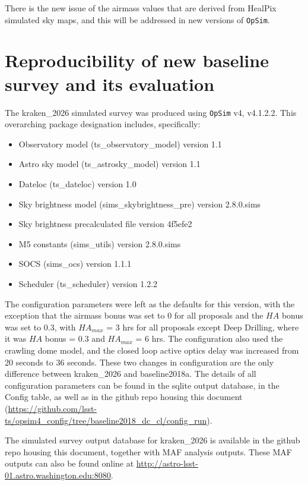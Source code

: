 \documentclass[DM,lsstdraft,authoryear,toc]{lsstdoc}
\newcommand{\opsim}{\texttt{OpSim}\xspace}
\begin{document}
There is the new issue of the airmass values that are derived from HealPix simulated sky maps, and this will be addressed
in new versions of \opsim.

\section{Reproducibility of new baseline survey and its evaluation}

The kraken\_2026  simulated survey was produced using \opsim v4, v4.1.2.2.  This overarching package designation includes, specifically:
\begin{itemize}
\item Observatory model (ts\_observatory\_model) version 1.1
\item Astro sky model (ts\_astrosky\_model) version 1.1
\item Dateloc (ts\_dateloc) version 1.0
\item Sky brightness model (sims\_skybrightness\_pre) version 2.8.0.sims
\item Sky brightness precalculated file version 4f5efe2
\item M5 constants (sims\_utils) version 2.8.0.sims
\item SOCS (sims\_ocs) version 1.1.1
\item Scheduler (ts\_scheduler) version 1.2.2
\end{itemize}

The configuration parameters were left as the defaults for this version, with the exception that the airmass bonus was set to 0 for all proposals and the $HA$ bonus was set to 0.3, with $HA_{max}$ = 3 hrs
for all proposals except Deep Drilling, where it was $HA$ bonus = 0.3 and $HA_{max}$ = 6 hrs. The configuration also used the
crawling dome model, and the closed loop active optics delay was increased from 20 seconds to 36 seconds.
These two changes in configuration are the only difference between kraken\_2026 and baseline2018a.
The details of all configuration parameters can be found in the sqlite output database, in the Config table, as well as in the
github repo housing this document (\url{https://github.com/lsst-ts/opsim4_config/tree/baseline2018_dc_cl/config_run}).

The simulated survey output database for kraken\_2026 is available in the github repo housing this document, together with MAF analysis outputs.
These MAF outputs can also be found online at \url{http://astro-lsst-01.astro.washington.edu:8080}.

\end{document}
